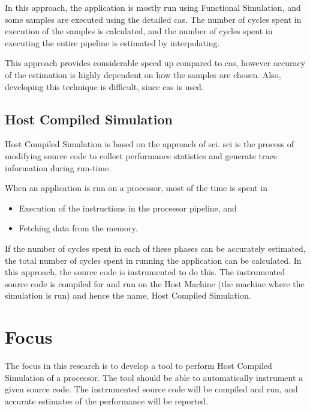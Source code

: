 In this approach, the application is mostly run using Functional Simulation, and some samples are executed using the detailed \gls{cas}. The number of cycles spent in execution of the samples is calculated, and the number of cycles spent in executing the entire pipeline is estimated by interpolating.

This approach provides considerable speed up compared to \gls{cas}, however accuracy of the estimation is highly dependent on how the samples are chosen. Also, developing this technique is difficult, since \gls{cas} is used.


\subsection{Host Compiled Simulation}
Host Compiled Simulation is based on the approach of \gls{sci}. \gls{sci} is the process of modifying source code to collect performance statistics and generate trace information during run-time. 

When an application is run on a processor, most of the time is spent in 
\begin{itemize} \itemsep -6pt
\item Execution of the instructions in the processor pipeline, and 
\item Fetching data from the memory. 
\end{itemize}

If the number of cycles spent in each of these phases can be accurately estimated, the total number of cycles spent in running the application can be calculated.  In this approach, the source code is instrumented to do this. The instrumented source code is compiled for and run on the Host Machine (the machine where the simulation is run) and hence the name, Host Compiled Simulation.

\section{Focus}
The focus in this research is to develop a tool to perform Host Compiled Simulation of a processor. The tool should be able to automatically instrument a given source code. The instrumented source code will be compiled and run, and accurate estimates of the performance will be reported.

%
%
%
